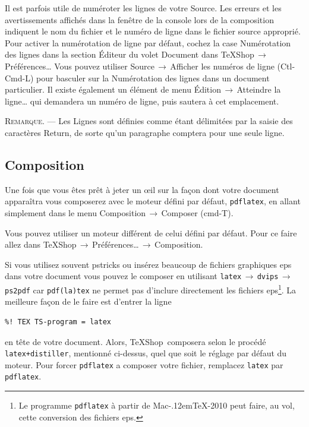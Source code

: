 \documentclass[11pt,french]{article}
\newcommand{\MacTeX}{Mac\kern-.12em\TeX}
\newcommand{\TS}{\textsf{\TeX Shop}}
\newcommand{\acr}[1]{\textsf{#1}}
\newcommand{\cmd}[1]{\textsf{#1}}
\newcommand{\mnu}[1]{\textsf{#1}}
\newcommand{\To}{\,\(\to\)\,}
\begin{document}
Il est parfois utile de numéroter les lignes de votre Source. Les erreurs et les avertissements affichés dans la fenêtre de la console lors de la composition indiquent le nom du fichier et le numéro de ligne dans le fichier source approprié. Pour activer la numérotation de ligne par défaut, cochez la case \cmd{Numérotation des lignes} dans la section \cmd{Éditeur} du volet \cmd{Document} dans \mnu{TeXShop}\To\mnu{Préférences…} Vous pouvez utiliser \cmd{Source}\To\mnu{Afficher les numéros de ligne} (\cmd{Ctl-Cmd-L}) pour basculer sur la \cmd{Numérotation des lignes} dans un document particulier. Il existe également un élément de menu \mnu{Édition}\To\mnu{Atteindre la ligne…} qui demandera un numéro de ligne, puis sautera à cet emplacement.

\textsc{Remarque}. --- Les \textsf{Lignes} sont définies comme étant délimitées par la saisie des caractères \cmd{Return}, de sorte qu'un paragraphe comptera pour une seule ligne.

%
\subsection{Composition}  

Une fois que vous êtes prêt à jeter un \oe{}il sur la façon dont votre document apparaîtra vous composerez avec le moteur défini par défaut, \texttt{pdflatex}, en allant simplement dans le menu \mnu{Composition}\To\mnu{Composer} (\cmd{cmd-T}).

Vous pouvez utiliser un moteur différent de celui défini par défaut. Pour ce faire allez dans \mnu{TeXShop}\To\mnu{Préférences…}\To\mnu{Composition}.

Si vous utilisez souvent \cmd{pstricks} ou insérez beaucoup de fichiers graphiques \acr{eps} dans votre document vous pouvez le composer en utilisant \texttt{latex}\To\texttt{dvips}\To\texttt{ps2pdf} car \texttt{pdf(la)tex} ne permet pas d'inclure directement les fichiers \acr{eps}\footnote{Le programme \texttt{pdflatex} à partir de \MacTeX-2010 peut faire, au vol, cette conversion des fichiers \acr{eps}.}. La meilleure façon de le faire est d'entrer la ligne
\begin{verbatim}
%! TEX TS-program = latex
\end{verbatim}
en tête de votre document. Alors, \TS\ composera selon le procédé \texttt{latex+distiller}, mentionné ci-dessus, quel que soit le réglage par défaut du moteur. Pour forcer \texttt{pdflatex} a composer votre fichier, remplacez \texttt{latex} par \texttt{pdflatex}.
\end{document}
